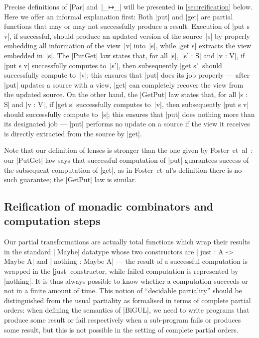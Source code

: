 \documentclass[fleqn]{llncs}
\begin{document}
Precise definitions of |Par| and~|_↦_| will be presented in \autoref{sec:reification} below.
Here we offer an informal explanation first:
Both |put| and |get| are partial functions that may or may not successfully produce a result.
Execution of |put s v|, if successful, should produce an updated version of the source~|s| by properly embedding all information of the view~|v| into~|s|, while |get s| extracts the view embedded in~|s|.
The |PutGet| law states that, for all |s|,~|s' : S| and |v : V|, if |put s v| successfully computes to~|s'|, then subsequently |get s'| should successfully compute to~|v|; this ensures that |put| does its job properly --- after |put| updates a source with a view, |get| can completely recover the view from the updated source.
On the other hand, the |GetPut| law states that, for all |s : S| and |v : V|, if |get s| successfully computes to~|v|, then subsequently |put s v| should successfully compute to~|s|; this ensures that |put| does nothing more than its designated job --- |put| performs no update on a source if the view it receives is directly extracted from the source by |get|.

Note that our definition of lenses is stronger than the one given by Foster~et~al~\cite{Foster-lenses}: our |PutGet| law says that successful computation of |put| guarantees success of the subsequent computation of |get|, as in Foster~et~al's definition there is no such guarantee; the |GetPut| law is similar.

\subsection{Reification of monadic combinators and computation steps}
\label{sec:reification}

Our partial transformations are actually total functions which wrap their results in the standard |^^^Maybe| datatype whose two constructors are |^^^just : A -> Maybe A| and |^^^nothing  : Maybe A| --- the result of a successful computation is wrapped in the |just| constructor, while failed computation is represented by |nothing|.
It is thus always possible to know whether a computation succeeds or not in a finite amount of time.
This notion of ``decidable partiality'' should be distinguished from the usual partiality as formalised in terms of complete partial orders:
when defining the semantics of |BiGUL|, we need to write programs that produce some result or fail respectively when a sub-program fails or produces some result, but this is not possible in the setting of complete partial orders.
\end{document}
